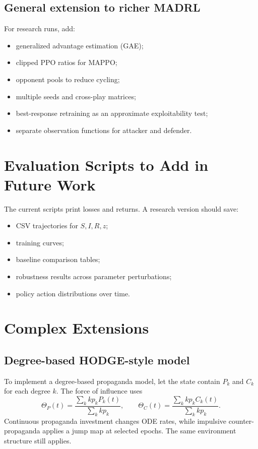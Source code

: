 \documentclass[11pt,a4paper]{article}
\begin{document}
\subsection{General extension to richer MADRL}
For research runs, add:
\begin{itemize}
\item generalized advantage estimation (GAE);
\item clipped PPO ratios for MAPPO;
\item opponent pools to reduce cycling;
\item multiple seeds and cross-play matrices;
\item best-response retraining as an approximate exploitability test;
\item separate observation functions for attacker and defender.
\end{itemize}

\section{Evaluation Scripts to Add in Future Work}
The current scripts print losses and returns. A research version should save:
\begin{itemize}
\item CSV trajectories for $S,I,R,z$;
\item training curves;
\item baseline comparison tables;
\item robustness results across parameter perturbations;
\item policy action distributions over time.
\end{itemize}

\section{Complex Extensions}
\subsection{Degree-based HODGE-style model}
To implement a degree-based propaganda model, let the state contain $P_k$ and $C_k$ for each degree $k$. The force of influence uses
\begin{equation}
\Theta_P(t)=\frac{\sum_k k p_k P_k(t)}{\sum_k k p_k},\qquad
\Theta_C(t)=\frac{\sum_k k p_k C_k(t)}{\sum_k k p_k}.
\end{equation}
Continuous propaganda investment changes ODE rates, while impulsive counter-propaganda applies a jump map at selected epochs. The same environment structure still applies.
\end{document}
